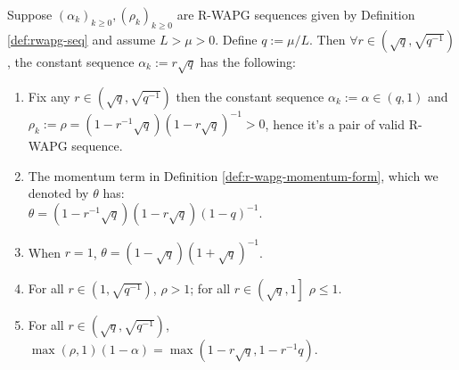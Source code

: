 \documentclass[12pt]{article}
\begin{document}
        \begin{lemma}\label{lemma:constant-rwapg-seq}
            Suppose $(\alpha_k)_{k \ge 0}, (\rho_k)_{k \ge 0}$ are R-WAPG sequences given by Definition \ref{def:rwapg-seq} and assume $L > \mu > 0$.
            Define $q := \mu/L$. 
            Then $\forall r \in \left(\sqrt{q},\sqrt{q^{-1}}\right)$, the constant sequence $\alpha_k := r \sqrt{q}$ has the following: 
            \begin{enumerate}
                \item Fix any $r \in \left(\sqrt{q}, \sqrt{q^{-1}}\right)$ then the constant sequence $\alpha_k := \alpha \in (q, 1)$ and\\
                $\rho_k := \rho=\left(1-r^{-1}\sqrt{q}\right)\left(1 - r \sqrt{q}\right)^{-1} > 0$, hence it's a pair of valid R-WAPG sequence. 
                \item The momentum term in Definition \ref{def:r-wapg-momentum-form}, which we denoted by $\theta$ has:\\ $\theta = (1 - r^{-1}\sqrt{q})(1 - r\sqrt{q})(1- q)^{-1}$. 
                \item When $r = 1$, $\theta = (1- \sqrt{q})(1 + \sqrt{q})^{-1}$. 
                \item For all $r \in \left(1, \sqrt{q^{-1}}\right)$, $\rho > 1$; for all $r \in \left(\sqrt{q}, 1\right]$ $\rho \le 1$. 
                \item For all $r \in \left(\sqrt{q}, \sqrt{q^{-1}}\right)$, $\max(\rho, 1)(1 - \alpha) = \max\left(1 - r\sqrt{q}, 1 - r^{-1}q\right)$. 
            \end{enumerate}
        \end{lemma}
\end{document}
